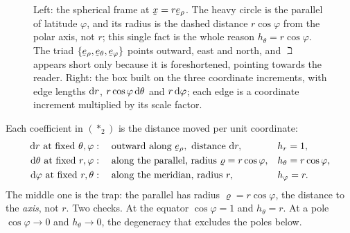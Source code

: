 \begin{solution}
\begin{figure}[htbp]
{}
\caption{Left: the spherical frame at $\bx=r\berho$. The heavy circle is the
parallel of latitude $\varphi$, and its radius is the dashed distance
$r\cos\varphi$ from the polar axis, not $r$; this single fact is the whole
reason $h_{\theta}=r\cos\varphi$. The triad $\{\berho,\beth,\beph\}$ points
outward, east and north, and $\beth$ appears short only because it is
foreshortened, pointing towards the reader. Right: the box built on the three
coordinate increments, with edge lengths $\mathrm{d} r$, $r\cos\varphi\,\mathrm{d}\theta$
and $r\,\mathrm{d}\varphi$; each edge is a coordinate increment multiplied by its
scale factor.}
\label{fig:sph}
\end{figure}

\begin{remark}
\label{rem:sphscale}
Each coefficient in $(\ast_{2})$ is the distance moved per unit
coordinate:
\[
\begin{aligned}
   \dl r\ \text{at fixed }\theta,\varphi&:\quad
     \text{outward along }\berho,\ \text{distance }\dl r,
     &&h_{r}=1,\\
   \dl\theta\ \text{at fixed }r,\varphi&:\quad
     \text{along the parallel, radius }\varrho=r\cos\varphi,
     &&h_{\theta}=r\cos\varphi,\\
   \dl\varphi\ \text{at fixed }r,\theta&:\quad
     \text{along the meridian, radius }r,
     &&h_{\varphi}=r .
\end{aligned}
\]
The middle one is the trap: the parallel has radius $\varrho=r\cos\varphi$,
the distance to the \emph{axis}, not $r$. Two checks. At the equator
$\cos\varphi=1$ and $h_{\theta}=r$. At a pole $\cos\varphi\to0$ and
$h_{\theta}\to0$, the degeneracy that excludes the poles below.
\end{remark}


\end{solution}
